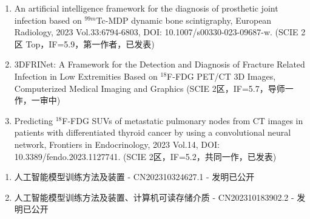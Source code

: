 \begin{publications}
    \begin{enumerate}
        \item An artificial intelligence framework for the diagnosis of prosthetic joint infection based on \(^{99m}\)Tc-MDP dynamic bone scintigraphy, European Radiology, 2023 Vol.33:6794-6803, DOI: 10.1007/s00330-023-09687-w. (SCIE 2区 Top，IF=5.9，第一作者，已发表)
        \item 3DFRINet: A Framework for the Detection and Diagnosis of Fracture Related Infection in Low Extremities Based on \(^{18}\)F-FDG PET/CT 3D Images, Computerized Medical Imaging and Graphics (SCIE 2区，IF=5.7，导师一作，一审中)
        \item Predicting \(^{18}\)F-FDG SUVs of metastatic pulmonary nodes from CT images in patients with differentiated thyroid cancer by using a convolutional neural network, Frontiers in Endocrinology, 2023 Vol.14, DOI: 10.3389/fendo.2023.1127741. (SCIE 2区，IF=5.2，共同一作，已发表)
    \end{enumerate}

    \begin{enumerate}
        \item 人工智能模型训练方法及装置 - CN202310324627.1 - 发明已公开
        \item 人工智能模型训练方法及装置、计算机可读存储介质 - CN202310183902.2 - 发明已公开
    \end{enumerate}
\end{publications}